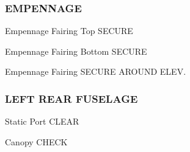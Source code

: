 \begin{multicols}{2}
\subsubsection*{EMPENNAGE}
\begin{enumerate*}
\item Empennage Fairing Top \dotfill SECURE
\item Empennage Fairing Bottom \dotfill SECURE
\item Empennage Fairing \dotfill SECURE AROUND ELEV.
\end{enumerate*}

\subsubsection*{LEFT REAR FUSELAGE}
\begin{enumerate*}
\item Static Port \dotfill CLEAR
\item Canopy \dotfill CHECK
\end{enumerate*}
\end{multicols} %
\cleardoublepage

